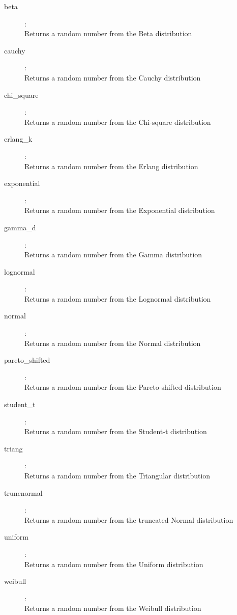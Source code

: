 \begin{description}
\item[beta]:  \\
    Returns a random number from the Beta distribution
\item[cauchy]:  \\
    Returns a random number from the Cauchy distribution
\item[chi\_square]:  \\
    Returns a random number from the Chi-square distribution
\item[erlang\_k]:  \\
    Returns a random number from the Erlang distribution
\item[exponential]:  \\
    Returns a random number from the Exponential distribution
\item[gamma\_d]:  \\
    Returns a random number from the Gamma distribution
\item[lognormal]:  \\
    Returns a random number from the Lognormal distribution
\item[normal]:  \\
    Returns a random number from the Normal distribution
\item[pareto\_shifted]:  \\
    Returns a random number from the Pareto-shifted distribution
\item[student\_t]:  \\
    Returns a random number from the Student-t distribution
\item[triang]:  \\
    Returns a random number from the Triangular distribution
\item[truncnormal]:  \\
    Returns a random number from the truncated Normal distribution
\item[uniform]:  \\
    Returns a random number from the Uniform distribution
\item[weibull]:  \\
    Returns a random number from the Weibull distribution

\end{description}

